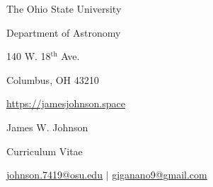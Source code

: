 \documentclass[cv.tex]{subfiles}
\begin{document}
\begin{center}
\parbox{.3\textwidth}{%
	\raggedleft
	The Ohio State University \par
	Department of Astronomy \par
	140 W. 18$^\text{th}$ Ave. \par
	Columbus, OH 43210 \par
	\url{https://jamesjohnson.space}
}
\hspace{1mm}
\vrule height 1.5cm width 0.4pt
\hspace{1mm}
\parbox{0.5\textwidth}{%
	{%
	\fontsize{30}{36} \selectfont James W. Johnson \par
	\fontsize{18}{25} \selectfont Curriculum Vitae \par
	\fontsize{11}{13} \selectfont
	\vspace{0.08cm}
	\href{mailto:johnson.7419@osu.edu}{johnson.7419@osu.edu} $\vert$
	\href{mailto:giganano9@gmail.com}{giganano9@gmail.com}
	}
}
\end{center}
\end{document}
